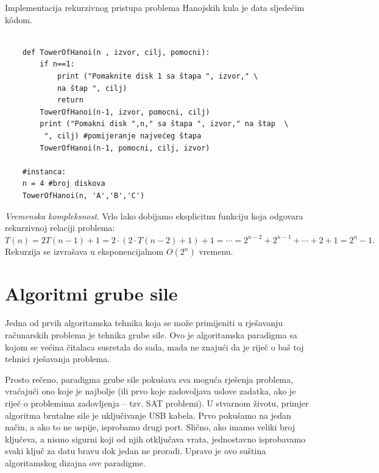 \begin{solution}
Implementacija rekurzivnog pristupa problema Hanojskih kula je data sljedećim k\^odom. 

\begin{verbatim}
	 
	def TowerOfHanoi(n , izvor, cilj, pomocni):
	    if n==1:
	        print ("Pomaknite disk 1 sa štapa ", izvor," \ 
	        na štap ", cilj)
	        return
	    TowerOfHanoi(n-1, izvor, pomocni, cilj)
	    print ("Pomakni disk ",n," sa štapa ", izvor," na štap  \ 
	     ", cilj) #pomijeranje najvećeg štapa
	    TowerOfHanoi(n-1, pomocni, cilj, izvor)
	
	#instanca:
	n = 4 #broj diskova
	TowerOfHanoi(n, 'A','B','C')
\end{verbatim} 

\textit{Vremenska kompleksnost}. Vrlo lako dobijamo eksplicitnu funkciju koja odgovara   rekurzivnoj relaciji problema: $T(n)= 2  T(n-1) + 1 = 2 \cdot ( 2 \cdot T(n-2) + 1) + 1 = \cdots = 2^{n-2} + 2^{n-1} + \cdots + 2 + 1 = 2^n -1.$
Rekurzija se izvrašava u eksponencijalnom $O(2^n)$ vremenu.  %


\end{solution}	
 

\section{Algoritmi grube sile}



Jedna od prvih algoritamska tehnika koja se može primijeniti u rješavanju  računarskih problema je tehnika grube sile. Ovo je algoritamska para\-digma sa kojom se većina čitalaca susretala do sada, mada ne znajući da je riječ o baš toj tehnici rješavanja problema.

Prosto rečeno, paradigma grube sile pokušava sva moguća rješenja proble\-ma, vraćajući ono koje je najbolje (ili prvo koje zadovoljava uslove zadatka, ako je riječ o problemima zadovljenja -- tzv. SAT problemi). U stvarnom životu,  primjer algoritma brutalne sile je uključivanje USB kabela. Prvo pokušamo  na jedan način, a ako to ne uspije, isprobamo drugi port.  Slično, ako imamo veliki broj ključeva, a nismo sigurni koji od njih otključava vrata, jednostavno isprobavamo svaki ključ za datu bravu dok jedan ne proradi. Upravo je ovo suština algoritamskog dizajna ove paradigme.

